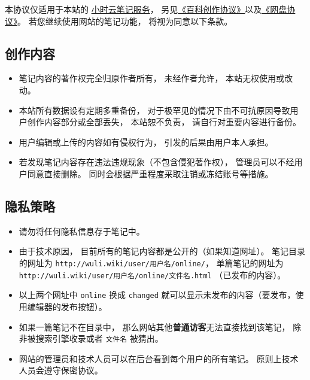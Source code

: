 
本协议仅适用于本站的 \href{http://wuli.wiki/note/}{小时云笔记服务}， 另见\href{http://wuli.wiki/online/licens.html}{《百科创作协议》}以及\href{http://www.example.com}{《网盘协议》}。 若您继续使用网站的笔记功能， 将视为同意以下条款。

\subsection{创作内容}
\begin{itemize}
\item 笔记内容的著作权完全归原作者所有， 未经作者允许， 本站无权使用或改动。
\item 本站所有数据设有定期多重备份， 对于极罕见的情况下由不可抗原因导致用户创作内容部分或全部丢失， 本站恕不负责， 请自行对重要内容进行备份。
\item 用户编辑或上传的内容如有侵权行为， 引发的后果由用户本人承担。
\item 若发现笔记内容存在违法违规现象（不包含侵犯著作权）， 管理员可以不经用户同意直接删除。 同时会根据严重程度采取注销或冻结账号等措施。
\end{itemize}

\subsection{隐私策略}
\begin{itemize}
\item 请勿将任何隐私信息存于笔记中。
\item 由于技术原因， 目前所有的笔记内容都是公开的（如果知道网址）。 笔记目录的网址为 \verb|http://wuli.wiki/user/用户名/online/|， 单篇笔记的网址为 \verb|http://wuli.wiki/user/用户名/online/文件名.html| （已发布的内容）。
\item 以上两个网址中 \verb|online| 换成 \verb|changed| 就可以显示未发布的内容（要发布，使用编辑器的发布按钮）。
\item 如果一篇笔记不在目录中， 那么网站其他\textbf{普通访客}无法直接找到该笔记， 除非被搜索引擎收录或者 \verb|文件名| 被猜出。
\item 网站的管理员和技术人员可以在后台看到每个用户的所有笔记。 原则上技术人员会遵守保密协议。
\end{itemize}
